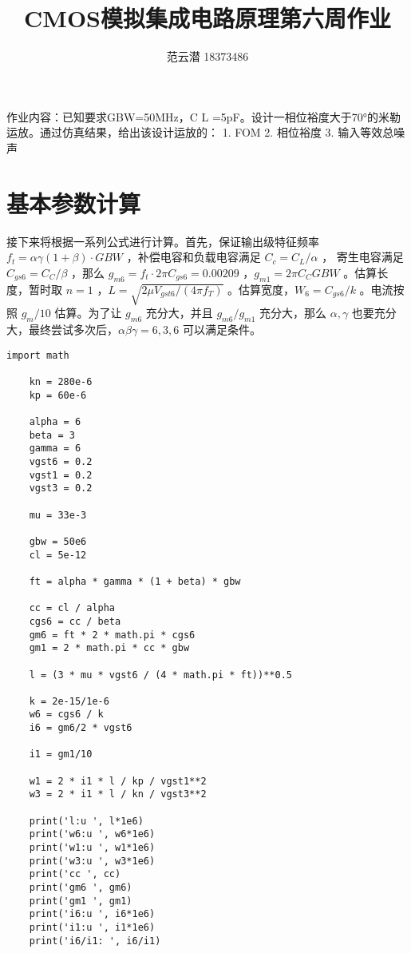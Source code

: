 \documentclass[lang=cn,11pt,a4paper,cite=authoryear]{elegantpaper}
\title{CMOS模拟集成电路原理\quad 第六周作业}
\author{范云潜 18373486}
\institute{微电子学院 184111 班}
\date{\zhtoday}
\begin{document}
\maketitle

作业内容：已知要求GBW=50MHz，C L =5pF。设计一相位裕度大于70°的米勒运放。通过仿真结果，给出该设计运放的：
1. FOM
2. 相位裕度
3. 输入等效总噪声

\tableofcontents

\listoffigures

\section{基本参数计算}

接下来将根据一系列公式进行计算。首先，保证输出级特征频率 \(f_t = \alpha \gamma (1 + \beta) \cdot GBW\) ，补偿电容和负载电容满足 \(C_c = C_L / \alpha\) ， 寄生电容满足 \(C_{gs6} = C_C / \beta\) ，那么 \(g_{m6} = f_t \cdot 2 \pi C_{gs6} = 0.00209\) ，\(g_{m1} = 2 \pi C_C GBW\) 。估算长度，暂时取 \(n=1\) ，\(L = \sqrt{2 \mu V_{gst6} / (4 \pi f_T)}\) 。估算宽度，\(W_6 = C_{gs6} / k\) 。电流按照 \(g_m / 10\) 估算。为了让 \(g_{m6}\) 充分大，并且 \(g_{m6} / g_{m1}\) 充分大，那么 \(\alpha, \gamma \) 也要充分大，最终尝试多次后，\(\alpha \beta \gamma = 6,3,6\) 可以满足条件。

\begin{lstlisting}[caption={估算程序}]
    import math 

    kn = 280e-6
    kp = 60e-6

    alpha = 6
    beta = 3
    gamma = 6
    vgst6 = 0.2
    vgst1 = 0.2
    vgst3 = 0.2

    mu = 33e-3

    gbw = 50e6
    cl = 5e-12

    ft = alpha * gamma * (1 + beta) * gbw 

    cc = cl / alpha 
    cgs6 = cc / beta 
    gm6 = ft * 2 * math.pi * cgs6
    gm1 = 2 * math.pi * cc * gbw 

    l = (3 * mu * vgst6 / (4 * math.pi * ft))**0.5

    k = 2e-15/1e-6
    w6 = cgs6 / k 
    i6 = gm6/2 * vgst6 

    i1 = gm1/10 

    w1 = 2 * i1 * l / kp / vgst1**2
    w3 = 2 * i1 * l / kn / vgst3**2

    print('l:u ', l*1e6)
    print('w6:u ', w6*1e6)
    print('w1:u ', w1*1e6)
    print('w3:u ', w3*1e6)
    print('cc ', cc)
    print('gm6 ', gm6)
    print('gm1 ', gm1)
    print('i6:u ', i6*1e6)
    print('i1:u ', i1*1e6)
    print('i6/i1: ', i6/i1)
    
\end{lstlisting}
\end{document}
